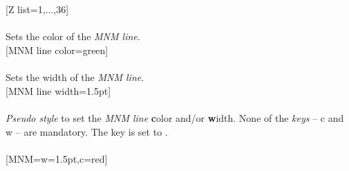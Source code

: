 \\ [10pt]\makebox[\linewidth][c]{\scalebox{.6}{\pgfPT[show MNM line=false]}}%
\\ [10pt][Z list={1,...,36}]%
\\ [10pt]\makebox[\linewidth][c]{\scalebox{.6}{\pgfPT[Z list={1,...,36}]}}%
\\ [0pt]\pgfPTendoption%
\label{option_MNM line color}%
%
{Sets the color of the \textit{MNM line}.}%
\\ [5pt][MNM line color=green]%
\\ [10pt]\makebox[\linewidth][c]{\scalebox{.6}{\pgfPT[MNM line color=green]}}%
\\ [0pt]\pgfPTendoption%
\label{option_MNM line width}%
%
{Sets the width of the \textit{MNM line}.}%
\\ [5pt][MNM line width=1.5pt]%
\\ [10pt]\makebox[\linewidth][c]{\scalebox{.6}{\pgfPT[MNM line width=1.5pt]}}%
\\ [0pt]\pgfPTendoption%
\label{style_MNM}%
%
{\textit{Pseudo style} to set the \textit{MNM line} \textbf{c}olor and/or \textbf{w}idth. None of the \textit{keys} -- c and w -- are mandatory. The key  is set to .
\\ [3pt]%
}%
\\ [5pt][MNM={w=1.5pt,c=red}]%
\\ [10pt]\makebox[\linewidth][c]{\scalebox{.6}{\pgfPT[MNM={w=1.5pt,c=red}]}}%
\\ [0pt]\pgfPTendstyle%
\endinput%
